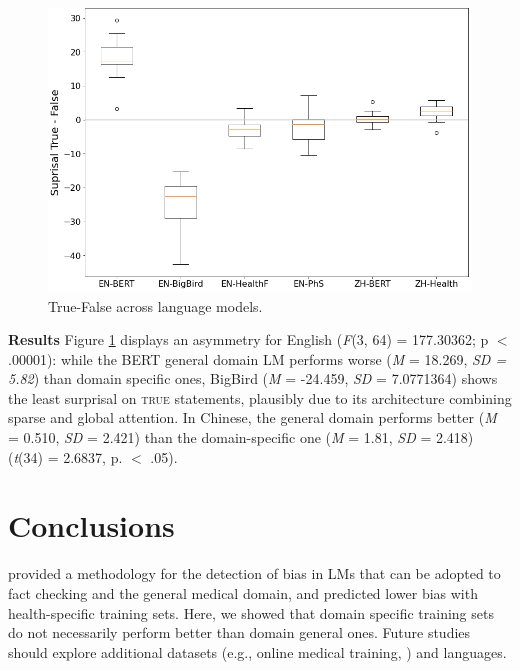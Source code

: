 \documentclass{IOS-Book-Article}
\begin{document}
\begin{figure}
    \centering
    \small
    \includegraphics[scale=0.37]{graphmatplot}
    \caption{True-False across language models. }
    \label{results}
\end{figure}

\noindent \textbf{Results} Figure \ref{results} displays an asymmetry for English (\textit{F}(3, 64) = 177.30362; p $<$ .00001): while the BERT general domain LM performs worse (\textit{M} = 18.269, \textit{SD = 5.82}) than domain specific ones, BigBird (\textit{M} = -24.459, \textit{SD} = 7.0771364) shows the least surprisal on \textsc{true} statements, plausibly due to its architecture combining sparse and global attention. In Chinese, the general domain performs better (\textit{M} = 0.510, \textit{SD} = 2.421) than the domain-specific one (\textit{M} = 1.81, \textit{SD} = 2.418) (\textit{t}(34) = 2.6837, p. $<$ .05).

\vspace{-4mm}
\section{Conclusions}
\cite{r1} provided a methodology for the detection of bias in LMs that can be adopted to fact checking and the general medical domain, and predicted lower bias with health-specific training sets. Here, we showed that domain specific training sets do not necessarily perform better than domain general ones. Future studies should explore additional datasets (e.g., online medical training, \cite{r4}) and languages.
\end{document}
